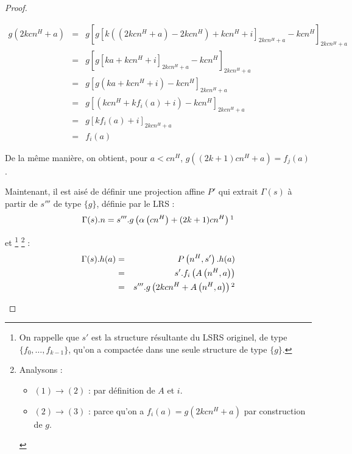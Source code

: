 \documentclass{article}
\begin{document}
\begin{proof}
\begin{enumerate}[itemsep=-1mm,leftmargin=2cm]
					\setcounter{equation}{0}
					\begin{eqnarray}
						g\left( 2kcn^H + a\right)	& = & 		g\left[ g\left[ k\left( \left(2kcn^H + a\right) - 2kcn^H \right) + kcn^H  + i\right]_{2kcn^H + a} - kcn^H  \right]_{2kcn^H + a} \\
													& = & 		g\left[ g\left[ k a + kcn^H  + i\right]_{2kcn^H + a} - kcn^H  \right]_{2kcn^H + a} \\
													& = & 		g\left[ g\left( k a + kcn^H  + i\right) - kcn^H  \right]_{2kcn^H + a} \\
													& = & 		g\left[ \left(kcn^H  +  k f_i(a) + i\right) - kcn^H  \right]_{2kcn^H + a} \\
													& = & 		g\left[ k f_i(a) + i \right]_{2kcn^H + a} \\
													& = & 		f_i(a)
					\end{eqnarray}
					
					De la même manière, on obtient, pour $a < cn^H$, $g\left( (2k+1)cn^H + a\right) = f_j(a)$. 
					
					Maintenant, il est aisé de définir une projection affine $P'$ qui extrait $\Gamma(s)$ à partir de $s'''$ de type $\{g\}$, définie par le LRS :
					\[
						\Gamma(s).n = s'''.g\left( \alpha\left( cn^H\right) + (2k+1)cn^H\right) \footnotemark
					\]
					
					
					et
						\footnote{On rappelle que $s'$ est la structure résultante du LSRS originel, de type $\{f_0, \dots, f_{k-1}\}$, qu'on a compactée dans une seule structure de type $\{g\}$.}
						\footnote{Analysons :
							\begin{itemize}
								\setlength{\itemsep}{-1mm}
								\item 	$(1) \rightarrow (2)$ : par définition de $A$ et $i$.
								\item 	$(2) \rightarrow (3)$ : parce qu'on a $f_i(a) = g\left( 2kcn^H + a \right)$ par construction de $g$.
							\end{itemize}
							}
					 :
					\setcounter{equation}{0}
					\begin{eqnarray}
						\Gamma(s).h(a) 	& = &	P\left( n^H, s' \right).h(a) \\
										& = &	s'.f_i\left( A\left( n^H, a \right) \right) \\
										& = & 	s'''.g\left( 2kcn^H + A\left( n^H, a \right) \right) \footnotemark
					\end{eqnarray}
					
					
			\end{enumerate}
			
		\end{proof}
		
\end{document}
